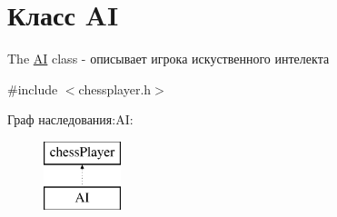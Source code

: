 \hypertarget{class_a_i}{}\section{Класс A\+I}
\label{class_a_i}


The \hyperlink{class_a_i}{A\+I} class -\/ описывает игрока искуственного интелекта  




{\ttfamily \#include $<$chessplayer.\+h$>$}

Граф наследования\+:A\+I\+:\begin{figure}[H]
\begin{center}
\leavevmode
\includegraphics[height=2.000000cm]{class_a_i}
\end{center}
\end{figure}
